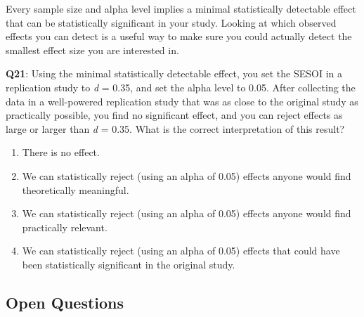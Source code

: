 \documentclass[
  oneside]{book}
\providecommand{\tightlist}{%
  \setlength{\itemsep}{0pt}\setlength{\parskip}{0pt}}
\begin{document}
Every sample size and alpha level implies a minimal statistically detectable effect that can be statistically significant in your study. Looking at which observed effects you can detect is a useful way to make sure you could actually detect the smallest
effect size you are interested in.

\textbf{Q21}: Using the minimal statistically detectable effect, you set the SESOI in a replication study to \emph{d} = 0.35, and set the alpha level to 0.05. After collecting the data in a well-powered replication study that was as close to the original study as practically possible, you find no significant effect, and you can reject effects as large or larger than \emph{d} = 0.35. What is the correct interpretation of this result?

\begin{enumerate}
\def\labelenumi{\Alph{enumi})}
\tightlist
\item
  There is no effect.
\item
  We can statistically reject (using an alpha of 0.05) effects anyone would find theoretically meaningful.
\item
  We can statistically reject (using an alpha of 0.05) effects anyone would find practically relevant.
\item
  We can statistically reject (using an alpha of 0.05) effects that could have been statistically significant in the original study.
\end{enumerate}

\hypertarget{open-questions-7}{%
\subsection{Open Questions}\label{open-questions-7}}
\end{document}

